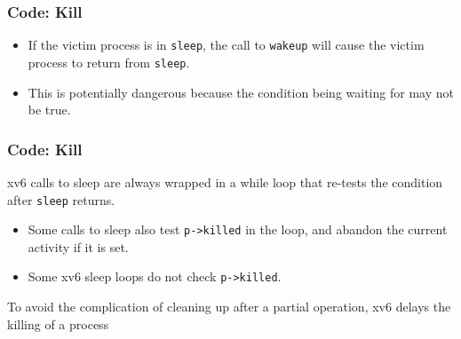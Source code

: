 \documentclass{beamer}
\begin{document}

\begin{frame}[t]
  \frametitle{Code: Kill}

  \begin{itemize}
  \item If the victim process is in \texttt{sleep}, the call to \texttt{wakeup} will
    cause the victim process to return from \texttt{sleep}.
  \item This is potentially dangerous because the condition being waiting
    for may not be true.
  \end{itemize}
  
\end{frame}


\begin{frame}[t]
  \frametitle{Code: Kill}
  xv6 calls to sleep are always wrapped in a while loop that re-tests the condition
  after \texttt{sleep} returns.
  \begin{itemize}
  \item Some calls to sleep also test \texttt{p->killed} in the loop,
    and abandon the current activity if it is set.
  \item Some xv6 sleep loops do not check \texttt{p->killed}.
  \end{itemize}

  \begin{center}
    To avoid the complication of cleaning up after a partial operation, xv6 delays
    the killing of a process
  \end{center}
\end{frame}
\end{document}
